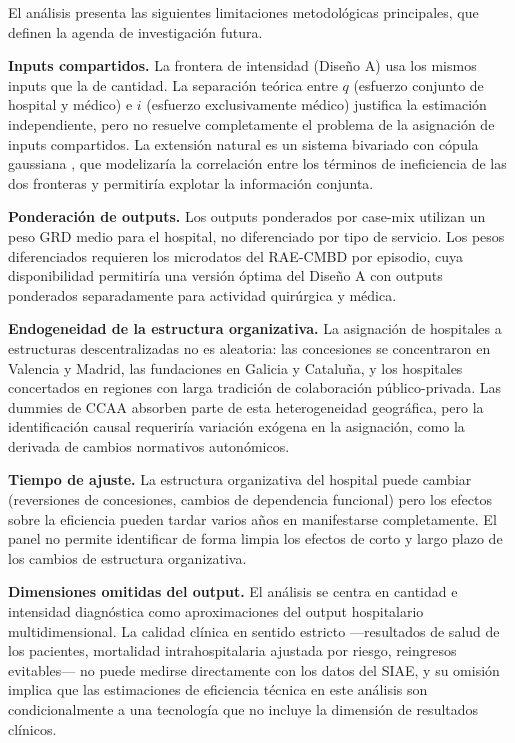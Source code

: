 \documentclass[12pt, a4paper, twoside, openright]{book}
\theoremstyle{plain}
\theoremstyle{definition}
\theoremstyle{remark}
\begin{document}
El análisis presenta las siguientes limitaciones metodológicas principales, que definen la agenda de investigación futura.

\textbf{Inputs compartidos.} La frontera de intensidad (Diseño A) usa los mismos inputs que la de cantidad. La separación teórica entre $q$ (esfuerzo conjunto de hospital y médico) e $i$ (esfuerzo exclusivamente médico) justifica la estimación independiente, pero no resuelve completamente el problema de la asignación de inputs compartidos. La extensión natural es un sistema bivariado con cópula gaussiana \citep{kumbhakar1997}, que modelizaría la correlación entre los términos de ineficiencia de las dos fronteras y permitiría explotar la información conjunta.

\textbf{Ponderación de outputs.} Los outputs ponderados por case-mix utilizan un peso GRD medio para el hospital, no diferenciado por tipo de servicio. Los pesos diferenciados requieren los microdatos del RAE-CMBD por episodio, cuya disponibilidad permitiría una versión óptima del Diseño A con outputs ponderados separadamente para actividad quirúrgica y médica.

\textbf{Endogeneidad de la estructura organizativa.} La asignación de hospitales a estructuras descentralizadas no es aleatoria: las concesiones se concentraron en Valencia y Madrid, las fundaciones en Galicia y Cataluña, y los hospitales concertados en regiones con larga tradición de colaboración público-privada. Las dummies de CCAA absorben parte de esta heterogeneidad geográfica, pero la identificación causal requeriría variación exógena en la asignación, como la derivada de cambios normativos autonómicos.

\textbf{Tiempo de ajuste.} La estructura organizativa del hospital puede cambiar (reversiones de concesiones, cambios de dependencia funcional) pero los efectos sobre la eficiencia pueden tardar varios años en manifestarse completamente. El panel no permite identificar de forma limpia los efectos de corto y largo plazo de los cambios de estructura organizativa.

\textbf{Dimensiones omitidas del output.} El análisis se centra en cantidad e intensidad diagnóstica como aproximaciones del output hospitalario multidimensional. La calidad clínica en sentido estricto ---resultados de salud de los pacientes, mortalidad intrahospitalaria ajustada por riesgo, reingresos evitables--- no puede medirse directamente con los datos del SIAE, y su omisión implica que las estimaciones de eficiencia técnica en este análisis son condicionalmente a una tecnología que no incluye la dimensión de resultados clínicos.
\end{document}
